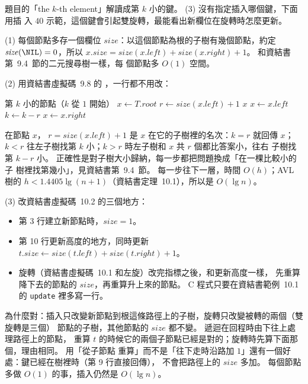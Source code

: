 \begin{pastsoln}
題目的「the $k$-th element」解讀成第 $k$ 小的鍵。 (3) 沒有指定插入哪個鍵，下面用插
入 $40$ 示範，這個鍵會引起雙旋轉，最能看出新欄位在旋轉時怎麼更新。

(1) 每個節點多存一個欄位 $\mathit{size}$：以這個節點為根的子樹有幾個節點，約定
$\mathit{size}(\NIL) = 0$，所以 $x.\mathit{size} = \mathit{size}(x.\mathit{left}) +
\mathit{size}(x.\mathit{right}) + 1$。 和資結書第~9.4~節的二元搜尋樹一樣，每
個節點多 $O(1)$ 空間。

(2) 用資結書虛擬碼~9.8 的 ，一行都不用改：
\begin{pseudo}[unbreakable]{第 $k$ 小的節點（$k$ 從 $1$ 開始）}
    \State $x \gets T.\mathit{root}$
        \State $r \gets \mathit{size}(x.\mathit{left}) + 1$ 
            \State \Return $x$
            \State $x \gets x.\mathit{left}$
        \Else
            \State $k \gets k - r$
            \State $x \gets x.\mathit{right}$
        \EndIf
    \EndWhile
    \State \Return \NIL {}
\EndFunction
\end{pseudo}
在節點 $x$，
$r = \mathit{size}(x.\mathit{left}) + 1$ 是 $x$ 在它的子樹裡的名次：$k = r$ 就回傳
$x$；$k < r$ 往左子樹找第 $k$ 小；$k > r$ 時左子樹和 $x$ 共 $r$ 個都比答案小，往右
子樹找第 $k - r$ 小。 正確性是對子樹大小歸納，每一步都把問題換成「在一棵比較小的子
樹裡找第幾小」，見資結書第~9.4~節。 每一步往下一層，時間 $O(h)$；AVL 樹的
$h < 1.4405 \lg(n+1)$（資結書定理~10.1），所以是 $O(\lg n)$。

(3) 改資結書虛擬碼~10.2 的三個地方：
\begin{itemize}
\item 第 3 行建立新節點時，$\mathit{size} = 1$。
\item 第 10 行更新高度的地方，同時更新
$t.\mathit{size} \gets \mathit{size}(t.\mathit{left}) + \mathit{size}(t.\mathit{right}) + 1$。
\item 旋轉（資結書虛擬碼~10.1 和左旋）改完指標之後，和更新高度一樣，
先重算降下去的節點的 $\mathit{size}$，再重算升上來的節點。 C 程式只要在資結書範例~10.1
的 \texttt{update} 裡多寫一行。
\end{itemize}
為什麼對：插入只改變新節點到根這條路徑上的子樹，旋轉只改變被轉的兩個（雙旋轉是三個）
節點的子樹，其他節點的 $\mathit{size}$ 都不變。 遞迴在回程時由下往上處理路徑上的節點，
重算 $t$ 的時候它的兩個子節點已經是對的；旋轉時先算下面那個，理由相同。 用「從子節點
重算」而不是「往下走時沿路加 $1$」還有一個好處：鍵已經在樹裡時（第 9 行直接回傳），
不會把路徑上的 $\mathit{size}$ 多加。 每個節點多做 $O(1)$ 的事，插入仍然是 $O(\lg n)$。


\end{pastsoln}
